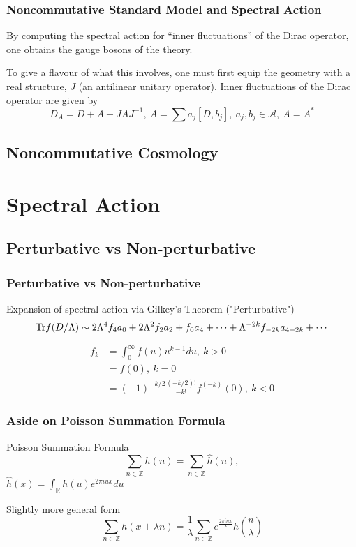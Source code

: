 \documentclass{beamer}
\def\Z{{\mathbb Z}}
\def\R{{\mathbb R}}
\def\cA{{\mathcal A}}
\def\Tr{{\rm Tr}}
\begin{document}
\begin{frame}
  \frametitle{Noncommutative Standard Model and Spectral Action}
  \begin{block}{}
    By computing the spectral action for ``inner fluctuations'' of the Dirac operator, one obtains the gauge bosons of the theory.
  \end{block}

  \begin{block}{}
    To give a flavour of what this involves, one must first equip the geometry with a real structure, $J$ (an antilinear unitary operator). Inner fluctuations of the Dirac operator are given by
    \[
    D_A = D + A + J A J^{-1},~ A = \sum a_j [D, b_j],~ a_j, b_j \in \cA,~ A = A^*
    \]
  \end{block}
\end{frame}

\subsection{Noncommutative Cosmology}

\section{Spectral Action}

\subsection{Perturbative vs Non-perturbative}

\begin{frame}
  \frametitle{Perturbative vs Non-perturbative}
  \begin{block}{Expansion of spectral action via Gilkey's Theorem ("Perturbative")}
    \[
      \Tr f (D/\Lambda) \sim 2 \Lambda^4 f_4 a_0 + 2 \Lambda^2 f_2 a_2 + f_0 a_4 + \cdots + \Lambda^{-2k} f_{-2k} a_{4+2k} + \cdots
    \]

    \begin{align*}
      f_k &= \int_{0}^{\infty} f(u) u^{k-1} du, ~ k>0 \\
      &= f(0), ~ k = 0\\
      &= (-1)^{-k/2} \frac{(-k/2)!}{-k!}f^{(-k)}(0), ~ k < 0
    \end{align*}
  \end{block}
\end{frame}

\begin{frame}
	\frametitle{Aside on Poisson Summation Formula}
	\begin{block}{Poisson Summation Formula}
		\[
			\sum_{n \in \Z} h(n) = \sum_{n\in \Z} \widehat{h}(n),
		\]
		$\widehat{h}(x) = \int_{\R} h(u) e^{2\pi i u x} du$
	\end{block}
	
	\pause
	
	\begin{block}{Slightly more general form}
		\[
		\sum_{n \in \Z} h(x + \lambda n) = \frac{1}{\lambda} \sum_{n \in \Z} e^{\frac{2\pi i n x}{\lambda}}\widehat{h}(\frac{n}{\lambda})
		\]
	\end{block}
	
	
\end{frame}
\end{document}
